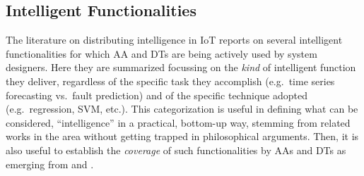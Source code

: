 \subsection{Intelligent Functionalities}
\label{ssec:mas+dt:functionalities}


The literature on distributing intelligence in IoT reports on several intelligent functionalities for which AA and DTs are being actively used by system designers. 
%
Here they are summarized focussing on the \textit{kind} of intelligent function they deliver, regardless of the specific task they accomplish (e.g.\ time series forecasting vs.\ fault prediction) and of the specific technique adopted (e.g.\ regression, SVM, etc.).
%
This categorization is useful in defining what can be considered, ``intelligence'' in a practical, bottom-up way, stemming from related works in the area without getting trapped in philosophical arguments.
%
Then, it is also useful to establish the \emph{coverage} of such functionalities by AAs and DTs as emerging from  and .

